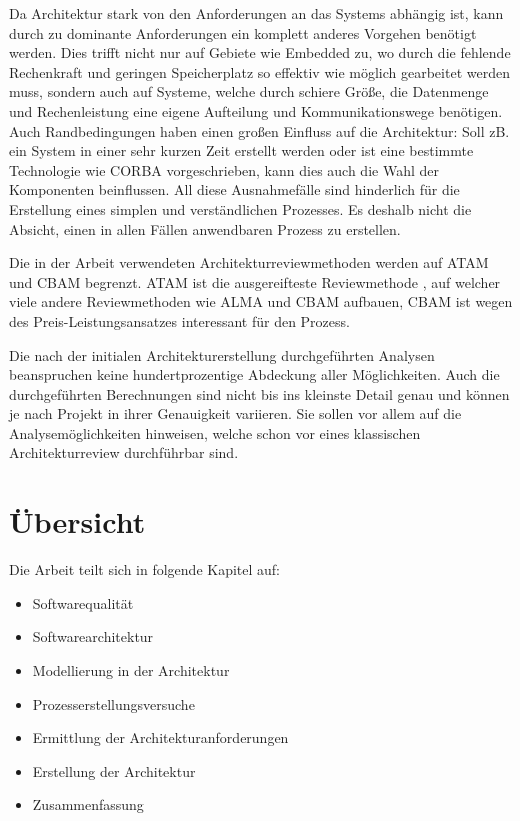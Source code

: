 Da Architektur stark von den Anforderungen an das Systems abhängig ist, kann durch zu dominante Anforderungen ein komplett anderes Vorgehen benötigt werden. Dies trifft nicht nur auf Gebiete wie Embedded zu, wo durch die fehlende Rechenkraft und geringen Speicherplatz so effektiv wie möglich gearbeitet werden muss, sondern auch auf Systeme, welche durch schiere Größe, die Datenmenge und Rechenleistung eine eigene Aufteilung und Kommunikationswege benötigen. Auch Randbedingungen haben einen großen Einfluss auf die Architektur: Soll zB. ein System in einer sehr kurzen Zeit erstellt werden oder ist eine bestimmte Technologie wie CORBA vorgeschrieben, kann dies auch die Wahl der Komponenten beinflussen. All diese Ausnahmefälle sind hinderlich für die Erstellung eines simplen und verständlichen Prozesses. Es deshalb nicht die Absicht, einen in allen Fällen anwendbaren Prozess zu erstellen.

Die in der Arbeit verwendeten Architekturreviewmethoden werden auf ATAM und CBAM begrenzt. ATAM ist die ausgereifteste Reviewmethode \cite[S. 184]{basiswissen}, auf welcher viele andere Reviewmethoden wie ALMA und CBAM aufbauen, CBAM ist wegen des Preis-Leistungsansatzes interessant für den Prozess.

Die nach der initialen Architekturerstellung durchgeführten Analysen beanspruchen keine hundertprozentige Abdeckung aller Möglichkeiten. Auch die durchgeführten Berechnungen sind nicht bis ins kleinste Detail genau und können je nach Projekt in ihrer Genauigkeit variieren. Sie sollen vor allem auf die Analysemöglichkeiten hinweisen, welche schon vor eines klassischen Architekturreview durchführbar sind.

\section{Übersicht}
Die Arbeit teilt sich in folgende Kapitel auf:

\begin{itemize}
  \item Softwarequalität
  \item Softwarearchitektur
  \item Modellierung in der Architektur
  \item Prozesserstellungsversuche
  \item Ermittlung der Architekturanforderungen
  \item Erstellung der Architektur
  \item Zusammenfassung
\end{itemize}


